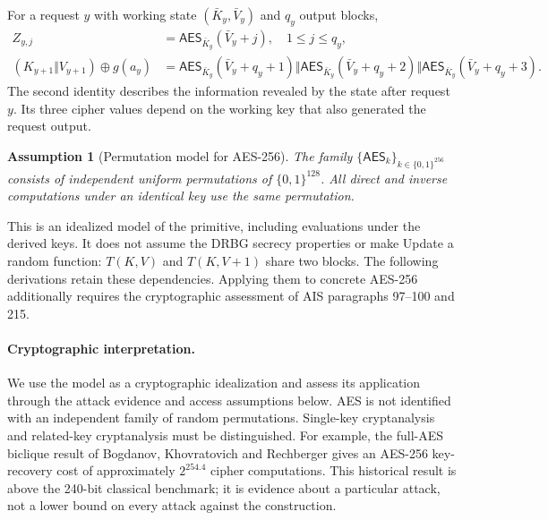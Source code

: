 \documentclass[journal=tosc,preprint,floatrow,nohyperxmp]{iacrtrans}
\numberwithin{lemma}{section}
\numberwithin{proposition}{section}
\newtheorem{assumption}{Assumption}[section]
\newcommand{\bits}{\{0,1\}}
\newcommand{\Enc}{\mathsf{AES}}
\numberwithin{equation}{section}
\theoremstyle{definition}
\numberwithin{definition}{section}
\theoremstyle{plain}
\begin{document}
For a request $y$ with working state $(\bar K_y,\bar V_y)$ and $q_y$ output blocks,
\begin{align}
 Z_{y,j}&=\Enc_{\bar K_y}(\bar V_y+j),\quad 1\le j\le q_y,\label{eq:request-sequence}\\
 (K_{y+1}\Vert V_{y+1})\oplus g(a_y)
 &=\Enc_{\bar K_y}(\bar V_y+q_y+1)\Vert\Enc_{\bar K_y}(\bar V_y+q_y+2)
 \Vert\Enc_{\bar K_y}(\bar V_y+q_y+3).\label{eq:revealed-triple}
\end{align}
The second identity describes the information revealed by the state after request $y$. Its three cipher values depend on the working key that also generated the request output.

\begin{assumption}[Permutation model for AES-256]\label{ass:aes}
The family $\{\Enc_k\}_{k\in\bits^{256}}$ consists of independent uniform permutations of $\bits^{128}$. All direct and inverse computations under an identical key use the same permutation.
\end{assumption}
This is an idealized model of the primitive, including evaluations under the derived keys. It does not assume the DRBG secrecy properties or make Update a random function: $T(K,V)$ and $T(K,V+1)$ share two blocks. The following derivations retain these dependencies. Applying them to concrete AES-256 additionally requires the cryptographic assessment of AIS paragraphs 97--100 and 215.

\paragraph{Cryptographic interpretation.}\label{sec:primitive-assessment}
We use the model as a cryptographic idealization and assess its application through the attack evidence and access assumptions below. AES is not identified with an independent family of random permutations. Single-key cryptanalysis and related-key cryptanalysis must be distinguished. For example, the full-AES biclique result of Bogdanov, Khovratovich and Rechberger \cite{biclique} gives an AES-256 key-recovery cost of approximately $2^{254.4}$ cipher computations. This historical result is above the 240-bit classical benchmark; it is evidence about a particular attack, not a lower bound on every attack against the construction.
\end{document}
